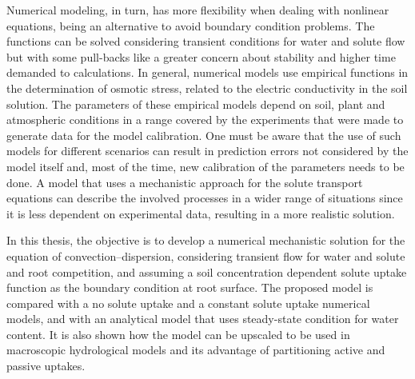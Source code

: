 Numerical modeling, in turn, has more flexibility when dealing with nonlinear equations, being an alternative to avoid boundary condition problems. 
The functions can be solved considering transient conditions for water and solute flow but with some pull-backs like a greater concern about stability and higher time demanded to calculations.
In general, numerical models use empirical functions in the determination of osmotic stress, related to the electric conductivity in the soil solution. 
The parameters of these empirical models depend on soil, plant and atmospheric conditions in a range covered by the experiments that were made to generate data for the model calibration. 
One must be aware that the use of such models for different scenarios can result in prediction errors not considered by the model itself and, most of the time, new calibration of the parameters needs to be done.
A model that uses a mechanistic approach for the solute transport equations can describe the involved processes in a wider range of situations since it is less dependent on experimental data, resulting in a more realistic solution.

In this thesis, the objective is to develop a numerical mechanistic solution for the equation of convection--dispersion, considering transient flow for water and solute and root competition, and assuming a soil concentration dependent solute uptake function as the boundary condition at root surface. 
The proposed model is compared with a no solute uptake and a constant solute uptake numerical models, and with an analytical model that uses steady-state condition for water content. 
It is also shown how the model can be upscaled to be used in macroscopic hydrological models and its advantage of partitioning active and passive uptakes.
